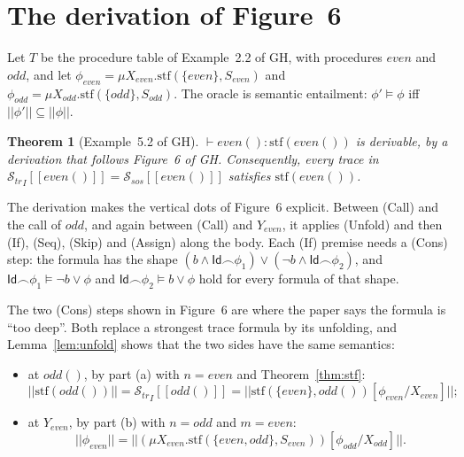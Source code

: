 \documentclass[11pt]{article}
\newcommand{\sem}[1]{[\![ #1 ]\!]}
\newcommand{\fsem}[1]{|\!|#1|\!|}
\newcommand{\Str}{{\mathcal{S}_{\mathit{tr}}}}
\newcommand{\Ssos}{{\mathcal{S}_{\mathit{sos}}}}
\newcommand{\chop}{\smallfrown}
\newcommand{\Id}{\mathsf{Id}}
\newcommand{\stf}{\mathrm{stf}}
\newcommand{\call}[1]{#1()}
\newcommand{\GH}[1]{#1 of GH}
\theoremstyle{plain}
\newtheorem{theorem}{Theorem}[section]
\theoremstyle{definition}
\theoremstyle{remark}
\begin{document}
\section{The derivation of Figure~6}\label{sec:example}

Let $T$ be the procedure table of \GH{Example~2.2}, with procedures
$\mathit{even}$ and $\mathit{odd}$, and let
$\phi_{\mathit{even}} = \mu X_{\mathit{even}}.\stf(\{\mathit{even}\},
S_{\mathit{even}})$ and $\phi_{\mathit{odd}} = \mu
X_{\mathit{odd}}.\stf(\{\mathit{odd}\}, S_{\mathit{odd}})$. The oracle is
semantic entailment: $\phi' \models \phi$ iff $\fsem{\phi'} \subseteq
\fsem{\phi}$.

\begin{theorem}[\GH{Example~5.2}]\label{thm:example}
  $\vdash \call{\mathit{even}} : \stf(\call{\mathit{even}})$ is derivable,
  by a derivation that follows \GH{Figure~6}. Consequently, every trace in
  $\Str_I\sem{\call{\mathit{even}}} = \Ssos\sem{\call{\mathit{even}}}$
  satisfies $\stf(\call{\mathit{even}})$.
\end{theorem}

The derivation makes the vertical dots of Figure~6 explicit. Between (Call)
and the call of $\mathit{odd}$, and again between (Call) and $Y_{even}$, it
applies (Unfold) and then (If), (Seq), (Skip) and (Assign) along the body.
Each (If) premise needs a (Cons) step: the formula has the shape
$(b \land \Id\chop\phi_1) \lor (\lnot b \land \Id\chop\phi_2)$, and
$\Id\chop\phi_1 \models \lnot b \lor \phi$ and $\Id\chop\phi_2 \models b
\lor \phi$ hold for every formula of that shape.

The two (Cons) steps shown in Figure~6 are where the paper says the formula
is ``too deep''. Both replace a strongest trace formula by its unfolding,
and Lemma~\ref{lem:unfold} shows that the two sides have the same
semantics:
\begin{itemize}
\item at $\call{\mathit{odd}}$, by part (a) with $n = \mathit{even}$ and
  Theorem~\ref{thm:stf}:
  \[
    \fsem{\stf(\call{\mathit{odd}})} = \Str_I\sem{\call{\mathit{odd}}} =
    \fsem{\stf(\{\mathit{even}\},
      \call{\mathit{odd}})[\phi_{\mathit{even}}/X_{\mathit{even}}]};
  \]
\item at $Y_{\mathit{even}}$, by part (b) with $n = \mathit{odd}$ and
  $m = \mathit{even}$:
  \[
    \fsem{\phi_{\mathit{even}}} =
    \fsem{(\mu X_{\mathit{even}}.\stf(\{\mathit{even}, \mathit{odd}\},
      S_{\mathit{even}}))[\phi_{\mathit{odd}}/X_{\mathit{odd}}]}.
  \]
\end{itemize}
\end{document}
